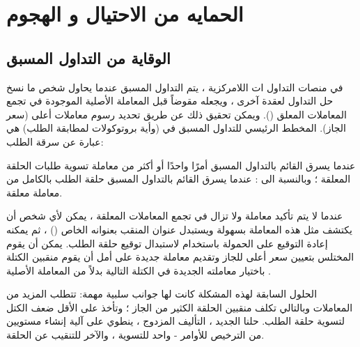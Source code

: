 \documentclass[12pt, a4paper, leqno]{report}
\theoremstyle{plain}
\theoremstyle{definition}
\begin{document}
\chapter{الحمايه من الاحتيال و الهجوم}
\begin{multicols}{2}
\section{الوقاية من التداول المسبق}
\begin{otherlanguage}{arabic}
في منصات التداول ات اللامركزية ، يتم التداول المسبق عندما يحاول شخص ما نسخ حل التداول  لعقدة آخرى ، ويجعله مقوضاً قبل المعاملة الأصلية الموجودة في تجمع المعاملات المعلق (). ويمكن تحقيق ذلك عن طريق تحديد رسوم معاملات أعلى (سعر الجاز). المخطط الرئيسي للتداول المسبق في  (وأية بروتوكولات لمطابقة الطلب) هي عبارة عن سرقة الطلب:

عندما يسرق القائم  بالتداول المسبق أمرًا واحدًا أو أكثر من معاملة تسوية طلبات الحلقة المعلقة ؛ وبالنسبة الى  : عندما يسرق القائم  بالتداول المسبق حلقة الطلب بالكامل من معاملة معلقة.

عندما لا يتم تأكيد معاملة  ولا تزال في تجمع المعاملات المعلقة ، يمكن لأي شخص أن يكتشف مثل هذه المعاملة بسهولة ويستبدل عنوان المنقب بعنوانه الخاص () ، ثم يمكنه إعادة التوقيع على الحمولة باستخدام  لاستبدال توقيع حلقة الطلب. يمكن أن يقوم المختلس بتعيين سعر أعلى للجاز وتقديم معاملة جديدة على أمل أن يقوم منقبين الكتلة باختيار معاملته الجديدة في الكتلة التالية بدلاً من المعاملة الأصلية .

الحلول السابقة لهذه المشكلة كانت لها جوانب سلبية مهمة: تتطلب المزيد من المعاملات وبالتالي تكلف منقبين الحلقة الكثير من الجاز ؛ وتأخذ على الأقل ضعف الكتل لتسوية حلقة الطلب. حلنا الجديد ، التأليف المزدوج  ، ينطوي على آلية إنشاء مستويين من الترخيص للأوامر - واحد للتسوية ، والآخر للتنقيب عن الحلقة.


\end{otherlanguage}
\end{multicols}
\end{document}
